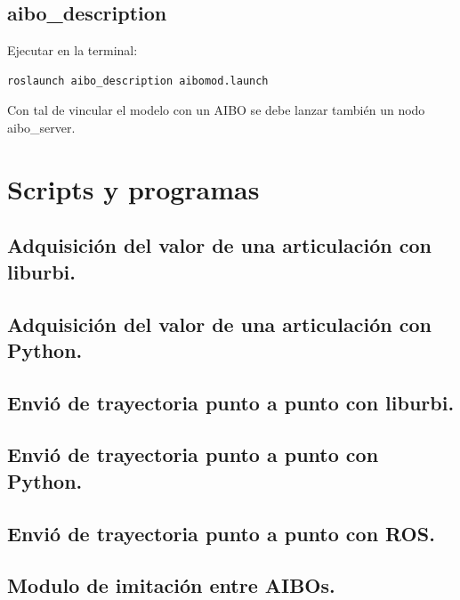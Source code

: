 \documentclass[12pt,a4paper,final,twoside]{book}
\begin{document}
\section{aibo{\_}description}
Ejecutar en la terminal:
\begin{lstlisting}[language=bash]
	roslaunch aibo_description aibomod.launch
\end{lstlisting}


Con tal de vincular el modelo con un AIBO se debe lanzar también un nodo aibo{\_}server.

\newpage

\chapter{Scripts y programas}
\thispagestyle{fancy}
\section{Adquisición del valor de una articulación con liburbi.}
\label{getDataOneLegC++}


\section{Adquisición del valor de una articulación con Python.}
\label{getDataOneLegPy}


\section{Envió de trayectoria punto a punto con liburbi.}\label{sinC}


\section{Envió de trayectoria punto a punto con Python.}\label{sinP}


\section{Envió de trayectoria punto a punto con ROS.}\label{sinlegROS}


\section{Modulo de imitación entre AIBOs.}\label{mimiccode}

\end{document}
